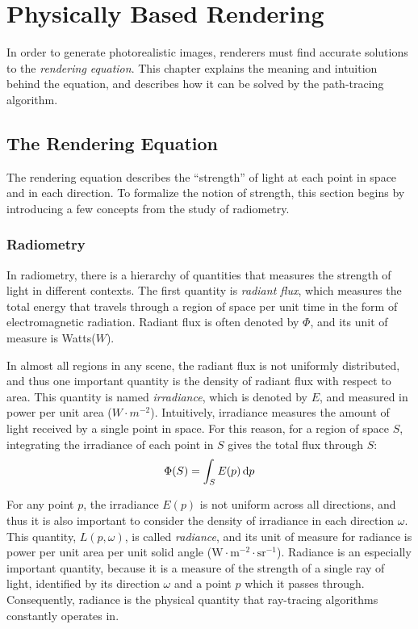 \chapter{Physically Based Rendering}

In order to generate photorealistic images, renderers must find accurate solutions to the \textit{rendering equation}. This chapter explains the meaning and intuition behind the equation, and describes how it can be solved by the path-tracing algorithm.

\section{The Rendering Equation}

The rendering equation describes the ``strength'' of light at each point in space and in each direction. To formalize the notion of strength, this section begins by introducing a few concepts from the study of radiometry.

\subsection{Radiometry}

In radiometry, there is a hierarchy of quantities that measures the strength of light in different contexts. The first quantity is \textit{radiant flux}, which measures the total energy that travels through a region of space per unit time in the form of electromagnetic radiation. Radiant flux is often denoted by $\Phi$, and its unit of measure is Watts($W$). 

In almost all regions in any scene, the radiant flux is not uniformly distributed, and thus one important quantity is the density of radiant flux with respect to area. This quantity is named \textit{irradiance}, which is denoted by $E$, and measured in power per unit area ($W\cdot m^{-2}$). Intuitively, irradiance measures the amount of light received by a single point in space. For this reason, for a region of space $S$, integrating the irradiance of each point in $S$ gives the total flux through $S$:
\begin{align}
    \Phi(S) = \int_S E(p) \,\mathrm{d} p 
    \label{irradiance integral}
\end{align}

For any point $p$, the irradiance $E(p)$ is not uniform across all directions, and thus it is also important to consider the density of irradiance in each direction $\omega$. This quantity, $L(p,\omega)$, is called \textit{radiance}, and its unit of measure for radiance is power per unit area per unit solid angle ($\text{W}\cdot\text{m}^{-2}\cdot \text{sr}^{-1}$). Radiance is an especially important quantity, because it is a measure of the strength of a single ray of light, identified by its direction $\omega$ and a point $p$ which it passes through. Consequently, radiance is the physical quantity that ray-tracing algorithms constantly operates in. 


